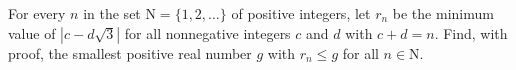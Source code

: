 For every $n$ in the set $\mathrm{N} = \{1,2,\dots \}$ of positive integers,
let $r_n$ be the minimum value of $|c-d\sqrt{3}|$ for all nonnegative
integers $c$ and $d$ with $c+d=n$. Find, with proof, the smallest
positive real number $g$ with $r_n \leq g$ for all $n \in \mathrm{N}$.
